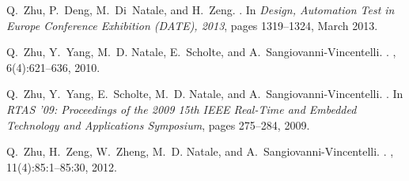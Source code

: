 \begin{thebibliography}{10}
Q.~Zhu, P.~Deng, M.~Di~Natale, and H.~Zeng.
.
\newblock In {\em Design, Automation Test in Europe Conference Exhibition
  (DATE), 2013}, pages 1319--1324, March 2013.

Q.~Zhu, Y.~Yang, M.~D. Natale, E.~Scholte, and A.~Sangiovanni-Vincentelli.
.
, 6(4):621--636,
  2010.

Q.~Zhu, Y.~Yang, E.~Scholte, M.~D. Natale, and A.~Sangiovanni-Vincentelli.
.
\newblock In {\em RTAS '09: Proceedings of the 2009 15th IEEE Real-Time and
  Embedded Technology and Applications Symposium}, pages 275--284, 2009.

Q.~Zhu, H.~Zeng, W.~Zheng, M.~D. Natale, and A.~Sangiovanni-Vincentelli.
.
, 11(4):85:1--85:30, 2012.

\end{thebibliography}


